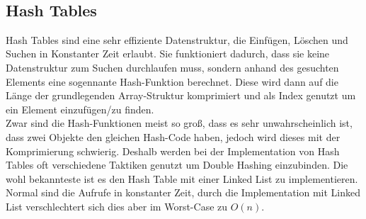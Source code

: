 \documentclass[
../../AuD-Zusammenfassung.tex,
]
{subfiles}
\begin{document}
\begin{minipage}{\textwidth}
    \centering
\end{minipage}\\[20pt]

\newpage
\subsection{Hash Tables}
Hash Tables sind eine sehr effiziente Datenstruktur, die Einfügen, Löschen und Suchen in Konstanter Zeit erlaubt. Sie funktioniert dadurch, dass sie keine Datenstruktur zum Suchen durchlaufen muss, sondern anhand des gesuchten Elements eine sogennante Hash-Funktion berechnet. Diese wird dann auf die Länge der grundlegenden Array-Struktur komprimiert und als Index genutzt um ein Element einzufügen/zu finden. \\
Zwar sind die Hash-Funktionen meist so groß, dass es sehr unwahrscheinlich ist, dass zwei Objekte den gleichen Hash-Code haben, jedoch wird dieses mit der Komprimierung schwierig. Deshalb werden bei der Implementation von Hash Tables oft verschiedene Taktiken genutzt um Double Hashing einzubinden. Die wohl bekannteste ist es den Hash Table mit einer Linked List zu implementieren. \\
Normal sind die Aufrufe in konstanter Zeit, durch die Implementation mit Linked List verschlechtert sich dies aber im Worst-Case zu $O(n)$.
\end{document}
